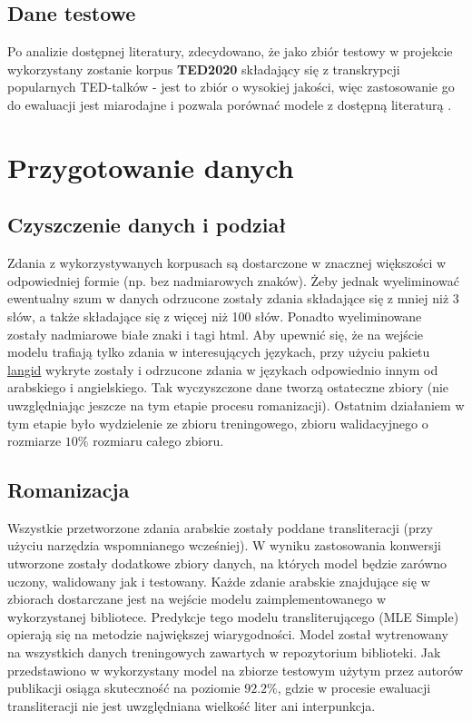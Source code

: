\documentclass[
    left=2.5cm,         %
    right=2.5cm,        %
    top=2.5cm,          %
    bottom=3cm,         %
    bindingoffset=6mm,  %
    nohyphenation=false %
]{eiti/eiti-report}
\begin{document}
\subsection{Dane testowe}
Po analizie dostępnej literatury, zdecydowano, że jako zbiór testowy w projekcie wykorzystany zostanie korpus \textbf{TED2020} \cite{reimers-2020-multilingual-sentence-bert} składający się z transkrypcji popularnych TED-talków - jest to zbiór o wysokiej jakości, więc zastosowanie go do ewaluacji jest miarodajne i pozwala porównać modele z dostępną literaturą \cite{CCmatrix}. 

\section{Przygotowanie danych}

\subsection{Czyszczenie danych i podział}
Zdania z wykorzystywanych korpusach są dostarczone w znacznej większości w odpowiedniej formie (np. bez nadmiarowych znaków). Żeby jednak wyeliminować ewentualny szum w danych odrzucone zostały zdania składające się z mniej niż 3 słów, a także składające się z więcej niż 100 słów. Ponadto wyeliminowane zostały nadmiarowe białe znaki i tagi html. Aby upewnić się, że na wejście modelu trafiają tylko zdania w interesujących językach, przy użyciu pakietu \href{https://github.com/saffsd/langid.py}{langid} wykryte zostały i odrzucone zdania w językach odpowiednio innym od arabskiego i angielskiego. Tak wyczyszczone dane tworzą ostateczne zbiory (nie uwzględniając jeszcze na tym etapie procesu romanizacji). Ostatnim działaniem w tym etapie było wydzielenie ze zbioru treningowego, zbioru walidacyjnego o rozmiarze $10\%$ rozmiaru całego zbioru.  

\subsection{Romanizacja}
Wszystkie przetworzone zdania arabskie zostały poddane transliteracji (przy użyciu narzędzia wspomnianego wcześniej). W wyniku zastosowania konwersji utworzone zostały dodatkowe zbiory danych, na których model będzie zarówno uczony, walidowany jak i testowany. Każde zdanie arabskie znajdujące się w zbiorach dostarczane jest na wejście modelu zaimplementowanego w wykorzystanej bibliotece. Predykcje tego modelu transliterującego (MLE Simple) opierają się na metodzie największej wiarygodności. Model został wytrenowany na wszystkich danych treningowych zawartych w repozytorium biblioteki. Jak przedstawiono w \cite{fadhl2021automatic} wykorzystany model na zbiorze testowym użytym przez autorów publikacji osiąga skuteczność na poziomie $92.2\%$, gdzie w procesie ewaluacji transliteracji nie jest uwzględniana wielkość liter ani interpunkcja.
\end{document}

